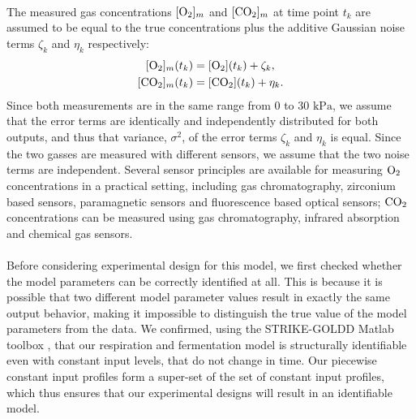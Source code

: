 \\
The measured gas concentrations $[\text{O}_2]_m$ and $[\text{CO}_2]_m$ at time point $t_k$ are assumed to be equal to the true concentrations plus the additive Gaussian noise terms $\zeta_k$ and $\eta_k$ respectively:
\begin{equation}
\begin{aligned}
\Coxy_{m}(t_k) &= \Coxy(t_k) + \zeta_k,\\
\Ccoxy_{m}(t_k) &= \Ccoxy(t_k) + \eta_k.
\end{aligned}
\end{equation}
Since both measurements are in the same range from $0$ to $30\text{ kPa}$, we assume that the error terms are identically and independently distributed for both outputs, and thus that variance, $\sigma^2$, of the error terms $\zeta_k$ and $\eta_k$ is equal.
{\color{red}Since the two gasses are measured with different sensors, we assume that the two noise terms are independent. Several sensor principles are available for measuring $\text{O}_2$ concentrations in a practical setting, including gas chromatography, zirconium based sensors, paramagnetic sensors and fluorescence based optical sensors; $\text{CO}_2$ concentrations can be measured using gas chromatography, infrared absorption and chemical gas sensors.}
\\
\\
{\color{red}Before considering experimental design for this model, we first checked whether the model parameters can be correctly identified at all. This is because it is possible that two different model parameter values result in exactly the same output behavior, making it impossible to distinguish the true value of the model parameters from the data. We confirmed, using the STRIKE-GOLDD Matlab toolbox \parencite{villaverde}, that our respiration and fermentation model is structurally identifiable even with constant input levels, that do not change in time. Our piecewise constant input profiles form a super-set of the set of constant input profiles, which thus ensures that our experimental designs will result in an identifiable model.}
